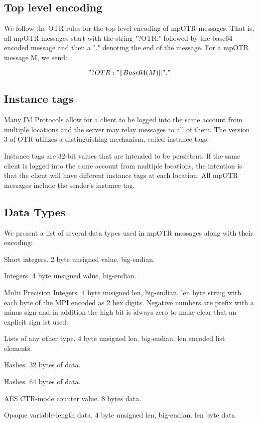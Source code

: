 \subsection{Top level encoding}
We follow the OTR rules for the top level encoding of mpOTR messages. That is, all mpOTR messages start with the string "?OTR:" followed by the base64 encoded message and then a "." denoting the end of the message. For a mpOTR message M, we send:

\[ 
  "?OTR:" \Vert Base64(M) \Vert "."
\]

\subsection{Instance tags}
\label{subsections:instance_tags}
Many IM Protocols allow for a client to be logged into the same account from multiple locations and the server may relay messages to all of them. The version 3 of OTR utilizes a distinguishing mechanism, called instance tags.

Instance tags are 32-bit values that are intended to be persistent. If the same client is logged into the same account from multiple locations, the intention is that the client will have different instance tags at each location. All mpOTR messages include the sender's instance tag.

\subsection{Data Types}
We present a list of several data types used in mpOTR messages along with their encoding:
\begin{description}[align=left]
\item [SHORT] Short integers. 2 byte unsigned value, big-endian.
\item [INT] Integers. 4 byte unsigned value, big-endian.
\item [MPI] Multi Precision Integers. 4 byte unsigned len, big-endian. len byte string with each byte of the MPI encoded as 2 hex digits. Negative numbers are prefix with a minus sign and in addition the high bit is always zero to make clear that an explicit sign ist used.
\item [LIST] Lists of any other type. 4 byte unsigned len, big-endian. len encoded list elements.
\item[HASH32] Hashes. 32 bytes of data.
\item[HASH64] Hashes. 64 bytes of data.
\item[CTR] AES CTR-mode counter value. 8 bytes data.
\item[DATA] Opaque variable-length data. 4 byte unsigned len, big-endian. len byte data.
\end{description}

